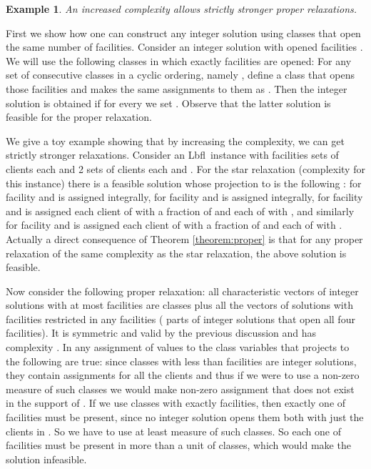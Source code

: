 \documentclass[11pt]{article}
\newtheorem{example}{Example}[section]
\newcommand{\lbfl}{{\sc Lbfl}}
\begin{document}
\begin{example}\label{proper_str}
An increased complexity allows strictly stronger proper relaxations.
\end{example}

First we show how one can construct any integer solution using classes that open the
same number of facilities.
Consider an integer solution  with opened facilities . We will use the following classes 
in which exactly  facilities are opened:
For any set of   consecutive classes in a cyclic ordering, namely , define a class that opens those facilities and makes the same assignments to them 
as . Then the integer solution is obtained  if for every  we set .
Observe that the latter solution is feasible for the proper relaxation.

We give a toy example showing that by increasing the complexity, we can
get strictly stronger relaxations. Consider an \lbfl\ instance with  facilities  sets 
of  clients each and 2 sets  of  clients each and .  For the star relaxation
(complexity  for this instance)
there is a feasible solution  whose projection to 
 is the following : for facility   and is assigned  integrally, for facility   and is assigned  integrally, for facility   and is assigned each client of  with a fraction of  and each of  with , and similarly for facility   and is assigned
each client of  with a fraction of  and each of  with . Actually
a direct consequence of Theorem \ref{theorem:proper} is that for any proper relaxation of the same complexity as the star relaxation, the above solution is feasible.

Now consider the following proper relaxation: all characteristic vectors 
of integer solutions with at most
 facilities are classes plus all the 
vectors of solutions with  facilities restricted in any  facilities ( parts of integer solutions that open all four facilities).
It is symmetric and valid by the previous discussion and has complexity . 
In any assignment of values to the class variables  that projects to  the following are true:
since classes with less than  facilities are integer solutions, they contain
assignments for all the clients and thus if we were 
to use a non-zero measure of such classes we would make non-zero assignment 
that does not exist in the support of .
 If we use
classes with exactly  facilities, then exactly one of facilities  must be present, 
since no integer solution opens them both with just the clients in . 
So we have to use at least  measure of such classes. 
So each one of facilities 
must be present in more than a unit of classes, which would make the solution infeasible.
\end{document}
